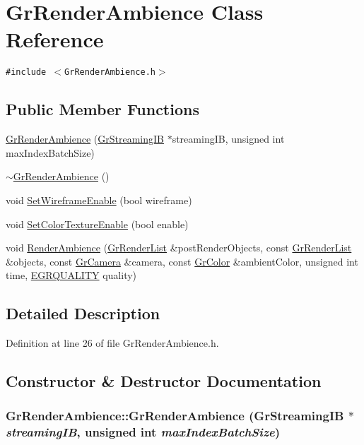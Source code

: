 \hypertarget{class_gr_render_ambience}{
\section{GrRenderAmbience Class Reference}
\label{class_gr_render_ambience}
}
{\tt \#include $<$GrRenderAmbience.h$>$}

\subsection*{Public Member Functions}
\begin{CompactItemize}
\item 
\hyperlink{class_gr_render_ambience_b7fa819c7c0490e45aa0cc76d7e4ccc0}{GrRenderAmbience} (\hyperlink{class_gr_streaming_i_b}{GrStreamingIB} $\ast$streamingIB, unsigned int maxIndexBatchSize)
\item 
\hyperlink{class_gr_render_ambience_5124e81699393a42aa18f64b784121cc}{$\sim$GrRenderAmbience} ()
\item 
void \hyperlink{class_gr_render_ambience_933fb2f85e7fe005bc9e7fd1e3c75288}{SetWireframeEnable} (bool wireframe)
\item 
void \hyperlink{class_gr_render_ambience_ab79d93102ccc766970a4496ee89e48c}{SetColorTextureEnable} (bool enable)
\item 
void \hyperlink{class_gr_render_ambience_86bed7518d863b549ea73ae06025f929}{RenderAmbience} (\hyperlink{class_gr_render_list}{GrRenderList} \&postRenderObjects, const \hyperlink{class_gr_render_list}{GrRenderList} \&objects, const \hyperlink{class_gr_camera}{GrCamera} \&camera, const \hyperlink{class_gr_color}{GrColor} \&ambientColor, unsigned int time, \hyperlink{enums_8h_697c1ee1354746841860d5bf9f81c033}{EGRQUALITY} quality)
\end{CompactItemize}


\subsection{Detailed Description}


Definition at line 26 of file GrRenderAmbience.h.

\subsection{Constructor \& Destructor Documentation}
\hypertarget{class_gr_render_ambience_b7fa819c7c0490e45aa0cc76d7e4ccc0}{
\subsubsection[{GrRenderAmbience}]{\setlength{\rightskip}{0pt plus 5cm}GrRenderAmbience::GrRenderAmbience ({\bf GrStreamingIB} $\ast$ {\em streamingIB}, \/  unsigned int {\em maxIndexBatchSize})}}
\label{class_gr_render_ambience_b7fa819c7c0490e45aa0cc76d7e4ccc0}




